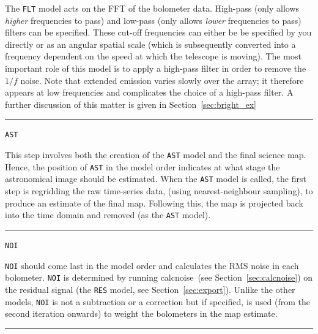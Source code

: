 \documentclass[twoside,11pt]{article}
\newcommand{\htmlref}[2]{#1}
\newcommand{\latexhtml}[2]{#1}
\newcommand{\xref}[3]{#1}
\renewcommand{\_}{\texttt{\symbol{95}}}
\newcommand{\task}[1]{\textsf{#1}}
\newcommand{\calcnoise}{\xref{\task{calcnoise}}{sun258}{CALCNOISE}}
\newcommand{\cref}[3]{\latexhtml{#1~\ref{#2}}{\htmlref{#3}{#2}}}
\begin{document}
\begin{minipage}[t]{0.88\linewidth}The \texttt{FLT} model acts on the FFT
of the bolometer data. High-pass (only allows \textit{higher} frequencies to
pass) and low-pass (only allows \textit{lower} frequencies to pass) filters
can be specified. These cut-off frequencies can either be be specified by
you directly or as an angular spatial scale (which is subsequently
converted into a frequency dependent on the speed at which the
telescope is moving). The most important role of this model is to
apply a high-pass filter in order to remove the $1/f$ noise. Note that
extended emission varies slowly over the array; it therefore appears
at low frequencies and complicates the choice of a high-pass filter. A
further discussion of this matter is given in
\cref{Section}{sec:bright_ex}{Extended galactic sources}\\
\end{minipage}
\hrule
\vspace{0.1cm}
\begin{minipage}[t]{0.12\linewidth}
\centering\texttt{AST}
\end{minipage}
\begin{minipage}[t]{0.88\linewidth}This step involves both the creation of the
\texttt{AST} model and the final science map. Hence, the position of
\texttt{AST} in the model order indicates at what stage the astronomical
image should be estimated. When the \texttt{AST} model is called, the first
step is regridding the raw time-series data, (using nearest-neighbour sampling),
to produce an estimate of the final map. Following this, the map is
projected back into the time domain and removed (as the \texttt{AST}
model).\\
\end{minipage}
\hrule
\vspace{0.1cm}
\begin{minipage}[t]{0.12\linewidth}
\centering\texttt{NOI}
\end{minipage}
\begin{minipage}[t]{0.88\linewidth}\texttt{NOI} should come last in the model
order and calculates the RMS noise in each bolometer.  \texttt{NOI} is
determined by running \calcnoise\ (see \cref{Section}{sec:calcnoise}{Checking the
array performance}) on the residual signal (the \texttt{RES}
model, see \cref{Section}{sec:export}{Exporting individual models}).  Unlike
the other models, \texttt{NOI} is
not a subtraction or a correction but if specified, is used (from the
second iteration onwards) to weight the bolometers in the map
estimate.\\
\end{minipage}
\hrule
\end{document}

